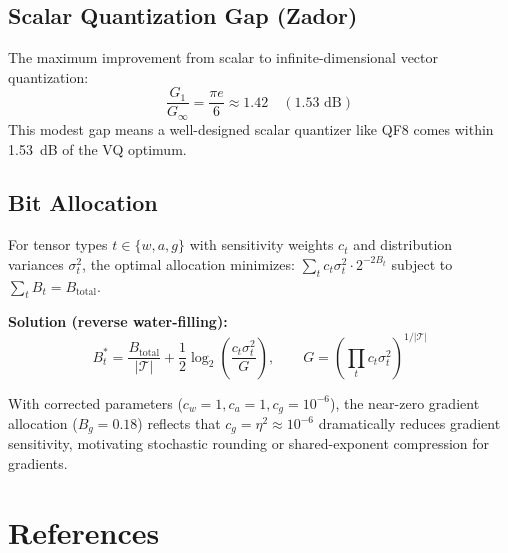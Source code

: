 \documentclass[11pt,letterpaper]{article}
\theoremstyle{definition}
\theoremstyle{remark}
\begin{document}
\subsection{Scalar Quantization Gap (Zador)}

The maximum improvement from scalar to infinite-dimensional vector
quantization:
\[
  \frac{G_1}{G_\infty} = \frac{\pi e}{6} \approx 1.42
  \quad (1.53 \text{ dB})
\]
This modest gap means a well-designed scalar quantizer like QF8 comes within
1.53~dB of the VQ optimum.

\subsection{Bit Allocation}

For tensor types $t \in \{w, a, g\}$ with sensitivity weights $c_t$ and
distribution variances $\sigma_t^2$, the optimal allocation minimizes:
$\sum_t c_t \sigma_t^2 \cdot 2^{-2B_t}$ subject to
$\sum_t B_t = B_{\text{total}}$.

\textbf{Solution (reverse water-filling):}
\[
  B_t^* = \frac{B_{\text{total}}}{|\mathcal{T}|}
  + \frac{1}{2}\log_2\!\left(\frac{c_t \sigma_t^2}{G}\right),
  \qquad G = \left(\prod_t c_t \sigma_t^2\right)^{1/|\mathcal{T}|}
\]

With corrected parameters ($c_w = 1, c_a = 1, c_g = 10^{-6}$), the near-zero
gradient allocation ($B_g = 0.18$) reflects that
$c_g = \eta^2 \approx 10^{-6}$ dramatically reduces gradient sensitivity,
motivating stochastic rounding or shared-exponent compression for gradients.


\section*{References}
\end{document}
